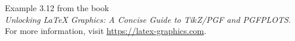 \documentclass{article}
\begin{document}
Example 3.12 from the book\\
\emph{Unlocking LaTeX Graphics: A Concise Guide to Ti$k$Z/PGF and PGFPLOTS}.\\
For more information, visit \url{https://latex-graphics.com}.
\par\bigskip

\end{document}
